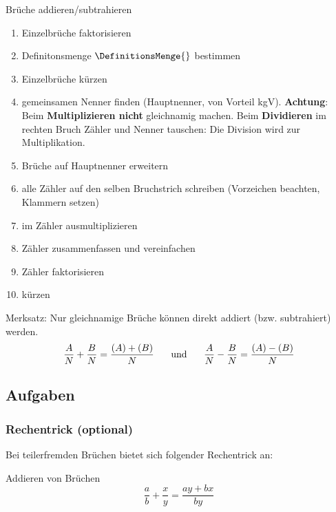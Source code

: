 \begin{rezept}{Brüche addieren/subtrahieren}{}\label{bruchtermeRezept}
\begin{enumerate}
	\item Einzelbrüche faktorisieren
  \item Definitonsmenge $\DefinitionsMenge{}$ bestimmen
	\item Einzelbrüche kürzen
	\item gemeinsamen Nenner finden (Hauptnenner, von Vorteil
	kgV). \textbf{Achtung}: Beim \textbf{Multiplizieren nicht}
	gleichnamig machen. Beim \textbf{Dividieren} im rechten Bruch Zähler
	und Nenner tauschen: Die Division wird zur Multiplikation.
	\item Brüche auf Hauptnenner erweitern
	\item alle Zähler auf den selben Bruchstrich schreiben (Vorzeichen beachten, Klammern setzen)
	\item im Zähler ausmultiplizieren
	\item Zähler zusammenfassen und vereinfachen
	\item Zähler faktorisieren
	\item kürzen
\end{enumerate}
\end{rezept}


\begin{gesetz}{}{}
Merksatz: Nur gleichnamige Brüche können direkt addiert (bzw. subtrahiert)
werden.
$$\frac{A}{N} + \frac{B}{N} = \frac{(A)+(B)}{N} \hspace{5mm} \text{
und } \hspace{5mm} \frac{A}{N} - \frac{B}{N} = \frac{(A)-(B)}{N} $$
\end{gesetz}



\subsection*{Aufgaben}

%

\newpage

\subsubsection{Rechentrick (optional)}
Bei teilerfremden Brüchen bietet sich folgender Rechentrick an:

\begin{gesetz}{Addieren von Brüchen}{}
$$\frac{a}{b} + \frac{x}{y} = \frac{ay + bx}{by}$$
\end{gesetz}


